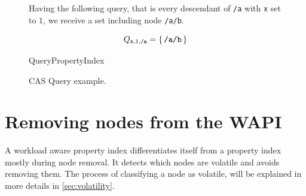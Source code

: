 \documentclass[abstracton,12pt]{scrreprt}
\begin{document}
\begin{figure}[h]
\begin{multicols}{2}
\begin{multicols}{2}
\begin{footnotesize}
                \vspace{5mm}
                Having the following query, that is every descendant of \texttt{/a} with \texttt{x} set to $1$,
                we receive a set including node \texttt{/a/b}.
            \end{footnotesize}
            \begin{large}
                $$ Q_{\texttt{x}, 1, \texttt{/a}} = \{\,\texttt{\normalsize/a/b}\,\}$$
            \end{large}
        \end{multicols}
        \columnbreak
        \begin{algorithm}[H]
            \DontPrintSemicolon
            \begin{scriptsize}
                \label{algo:query_pi}
                \caption{QueryPropertyIndex}
            \end{scriptsize}
        \end{algorithm}
    \end{multicols}
    \caption{CAS Query example.}
    \label{fig:cas_query}
\end{figure}

\section{Removing nodes from the WAPI}

A workload aware property index differentiates itself from a property index mostly during node removal.
It detects which nodes are volatile and avoids removing them.
The process of classifying a node as volatile, will be explained in more details in \cref{sec:volatility}.
\end{document}

